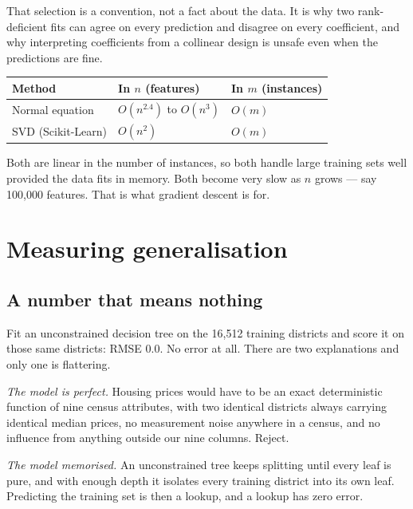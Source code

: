 \documentclass[11pt,a4paper]{article}
\begin{document}
\begin{keybox}[title={A choice, not a discovery}]
That selection is a convention, not a fact about the data. It is why two
rank-deficient fits can agree on every prediction and disagree on every
coefficient, and why interpreting coefficients from a collinear design is
unsafe even when the predictions are fine.
\end{keybox}

\begin{center}
\small
\begin{tabular}{lll}
\toprule
\textbf{Method} & \textbf{In $n$ (features)} & \textbf{In $m$ (instances)} \\
\midrule
Normal equation      & $O(n^{2.4})$ to $O(n^{3})$ & $O(m)$ \\
SVD (Scikit-Learn)   & $O(n^{2})$                 & $O(m)$ \\
\bottomrule
\end{tabular}
\end{center}

Both are linear in the number of instances, so both handle large training sets
well provided the data fits in memory. Both become very slow as $n$ grows ---
say 100{,}000 features. That is what gradient descent is for.

\section{Measuring generalisation}\label{sec:generalisation}

\subsection{A number that means nothing}

Fit an unconstrained decision tree on the 16{,}512 training districts and score
it on those same districts: RMSE $0.0$. No error at all. There are two
explanations and only one is flattering.

\emph{The model is perfect.} Housing prices would have to be an exact
deterministic function of nine census attributes, with two identical districts
always carrying identical median prices, no measurement noise anywhere in a
census, and no influence from anything outside our nine columns. Reject.

\emph{The model memorised.} An unconstrained tree keeps splitting until every
leaf is pure, and with enough depth it isolates every training district into
its own leaf. Predicting the training set is then a lookup, and a lookup has
zero error.
\end{document}
